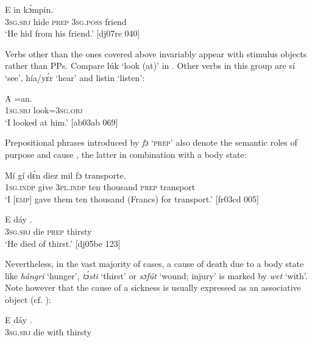 \ea%
    \label{ex:key:1057}
    \gll E       in    kɔ́mpin.\\
\textsc{3sg.sbj}  hide    \textsc{prep}  \textsc{3sg.poss}  friend\\

\glt ‘He hid from his friend.’ [dj07re 040]
\z

Verbs other than the ones covered above invariably appear with stimulus objects rather than PPs. Compare lúk ‘look (at)’ in . Other verbs in this group are sí ‘see’, hía/yɛ́r ‘hear’ and listin ‘listen’:


\ea%
    \label{ex:key:1058}
    \gll A    =an.\\
\textsc{1sg.sbj}  look=\textsc{3sg.obj}\\

\glt ‘I looked at him.’ [ab03ab 069]
\z

Prepositional phrases introduced by \textit{fɔ} ‘\textsc{prep}’ also denote the semantic roles of purpose\is{}  and cause , the latter in combination with a body state: 


\ea%
    \label{ex:key:1059}
    \gll Mí    gí  dɛ́n    diez  mil      fɔ  transporte.\\
\textsc{1sg.indp}  give  \textsc{3pl.indp}  ten  thousand  \textsc{prep}  transport\\

\glt ‘I \textsc{[emp]} gave them ten thousand (Francs) for transport.’ [fr03cd 005]
\z


\ea
	\label{ex:key:1060}
	\gll  E    dáy    .\\
\textsc{3sg.sbj}  die  \textsc{prep}  thirsty\\

\glt ‘He died of thirst.’ [dj05be 123]
\z

Nevertheless, in the vast majority of cases, a cause of death due to a body state like \textit{hángri} ‘hunger’, \textit{tɔ́sti} ‘thirst’  or \textit{sɔfút} ‘wound; injury’  is marked by \textit{wet} ‘with’. Note however that the cause of a sickness is usually expressed as an associative object (cf. ):


\ea%
    \label{ex:key:1061}
    \gll E    dáy      .\\
\textsc{3sg.sbj}  die  with    thirsty\\

